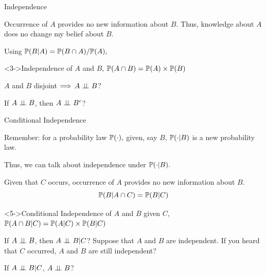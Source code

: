 \documentclass[handout,fleqn,aspectratio=169]{beamer}
\begin{document}
\begin{frame}{Independence}

\plitemsep 0.05in
\bci 

\item<1-> Occurrence of $A$ provides no new information about $B.$ Thus, knowledge about $A$ does no change my belief about $B.$ 

\item Using $\mathbb{P}( B | A ) = \mathbb{P}( B \cap A )/\mathbb{P}( A ),$ 

\begin{block}<3->{Independence of $A$ and $B$, }
$\mathbb{P}( A \cap B ) = \mathbb{P}( A ) \times \mathbb{P}( B )$
\end{block}

\item<5->  $A$ and $B$ disjoint $\Longrightarrow$ $A \perp \!\!\! \perp B$?


\item<7->  If $A \perp \!\!\! \perp B$,  then $A \perp \!\!\! \perp B^c$?  
\eci 
\end{frame}

\begin{frame}{Conditional Independence}

\plitemsep 0.07in
\bci 

\item<2-> Remember: for a probability law $\mathbb{P}( \cdot ),$ given, say $B$, $\mathbb{P}( \cdot | B )$ is a new probability law. 

\item<3-> Thus, we can talk about independence under $\mathbb{P}( \cdot | B ).$

\item<4-> Given that $C$ occurs, occurrence of $A$ provides no new information about $B.$
$$
\mathbb{P}( B | A \cap C ) = \mathbb{P}( B | C )
$$
\vspace{-0.2in}
\begin{block}<5->{Conditional Independence of $A$ and $B$ given $C$, }
$\mathbb{P}( A \cap B | C ) = \mathbb{P}( A |C ) \times \mathbb{P}( B |C )$
\end{block}

\smallskip
\item<7->  If $A \perp \!\!\! \perp B$,  then $A \perp \!\!\! \perp B | C$?
Suppose that $A$ and $B$ are independent. If you heard that $C$ occurred,  $A$ and $B$ are still independent?                                                         

\item<8->  If $A \perp \!\!\! \perp B | C$, $A \perp \!\!\! \perp B$?
\eci 
\end{frame}
\end{document}
